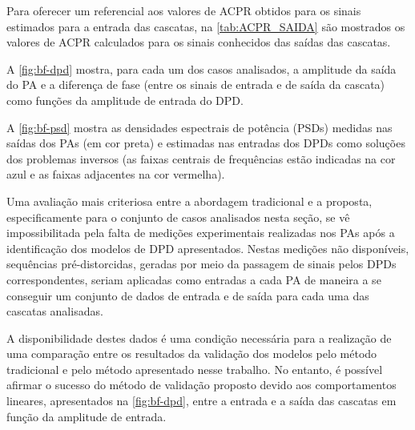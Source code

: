 Para oferecer um referencial aos valores de ACPR obtidos para os sinais estimados para a entrada das cascatas, na \autoref{tab:ACPR_SAIDA} são mostrados os valores de ACPR calculados para os sinais conhecidos das saídas das cascatas.

A \autoref{fig:bf-dpd} mostra, para cada um dos casos analisados, a amplitude da saída do PA e a diferença de fase (entre os sinais de entrada e de saída da cascata) como funções da amplitude de entrada do DPD.

A \autoref{fig:bf-psd} mostra as densidades espectrais de potência (PSDs) medidas nas saídas dos PAs (em cor preta) e estimadas nas entradas dos DPDs como soluções dos problemas inversos (as faixas centrais de frequências estão indicadas na cor azul e as faixas adjacentes na cor vermelha).




Uma avaliação mais criteriosa entre a abordagem tradicional e a proposta, especificamente para o conjunto de casos analisados nesta seção, se vê impossibilitada pela falta de medições experimentais realizadas nos PAs após a identificação dos modelos de DPD apresentados. Nestas medições não disponíveis, sequências pré-distorcidas, geradas por meio da passagem de sinais pelos DPDs correspondentes, seriam aplicadas como entradas a cada PA de maneira a se conseguir um conjunto de dados de entrada e de saída para cada uma das cascatas analisadas.

A disponibilidade destes dados é uma condição necessária para a realização de uma comparação entre os resultados da validação dos modelos pelo método tradicional e pelo método apresentado nesse trabalho. No entanto, é possível afirmar o sucesso do método de validação proposto devido aos comportamentos lineares, apresentados na \autoref{fig:bf-dpd}, entre a entrada e a saída das cascatas em função da amplitude de entrada.

